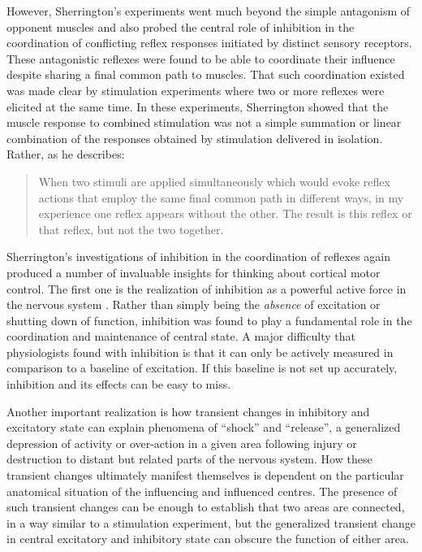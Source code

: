 However, Sherrington's experiments went much beyond the simple antagonism of opponent muscles and also probed the central role of inhibition in the coordination of conflicting reflex responses initiated by distinct sensory receptors. These antagonistic reflexes were found to be able to coordinate their influence despite sharing a final common path to muscles. That such coordination existed was made clear by stimulation experiments where two or more reflexes were elicited at the same time. In these experiments, Sherrington showed that the muscle response to combined stimulation was not a simple summation or linear combination of the responses obtained by stimulation delivered in isolation. Rather, as he describes:

\blockquote[{\protect\cite[p.461]{Sherrington1904}}]{When two stimuli are applied simultaneously which would evoke reflex actions that employ the same final common path in different ways, in my experience one reflex appears without the other. The result is this reflex or that reflex, but not the two together.}

Sherrington's investigations of inhibition in the coordination of reflexes again produced a number of invaluable insights for thinking about cortical motor control. The first one is the realization of inhibition as a powerful active force in the nervous system \cite{Sherrington1965}. Rather than simply being the \emph{absence} of excitation or shutting down of function, inhibition was found to play a fundamental role in the coordination and maintenance of central state. A major difficulty that physiologists found with inhibition is that it can only be actively measured in comparison to a baseline of excitation. If this baseline is not set up accurately, inhibition and its effects can be easy to miss.

Another important realization is how transient changes in inhibitory and excitatory state can explain phenomena of ``shock'' and ``release'', a generalized depression of activity or over-action in a given area following injury or destruction to distant but related parts of the nervous system. How these transient changes ultimately manifest themselves is dependent on the particular anatomical situation of the influencing and influenced centres. The presence of such transient changes can be enough to establish that two areas are connected, in a way similar to a stimulation experiment, but the generalized transient change in central excitatory and inhibitory state can obscure the function of either area.


